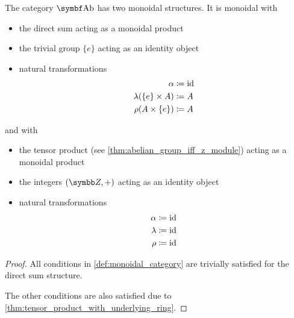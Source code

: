 \begin{proposition}\label{thm:ab_is_monoidal}
  The category \( \Cat{Ab} \) has two monoidal structures. It is monoidal with
  \begin{itemize}
    \item the direct sum acting as a monoidal product
    \item the trivial group \( \{ e \} \) acting as an identity object
    \item natural transformations
    \begin{align*}
      \alpha &\coloneqq \operatorname{id} \\
      \lambda(\{ e \} \times A) &\coloneqq A \\
      \rho(A \times \{ e \}) &\coloneqq A
    \end{align*}
  \end{itemize}
  and with
  \begin{itemize}
    \item the tensor product (see \cref{thm:abelian_group_iff_z_module}) acting as a monoidal product
    \item the integers \( (\Z, +) \) acting as an identity object
    \item natural transformations
    \begin{align*}
      \alpha &\coloneqq \operatorname{id} \\
      \lambda &\coloneqq \operatorname{id} \\
      \rho &\coloneqq \operatorname{id}
    \end{align*}
  \end{itemize}
\end{proposition}
\begin{proof}
  All conditions in \cref{def:monoidal_category} are trivially satisfied for the direct sum structure.

  The other conditions are also satisfied due to \cref{thm:tensor_product_with_underlying_ring}.
\end{proof}


